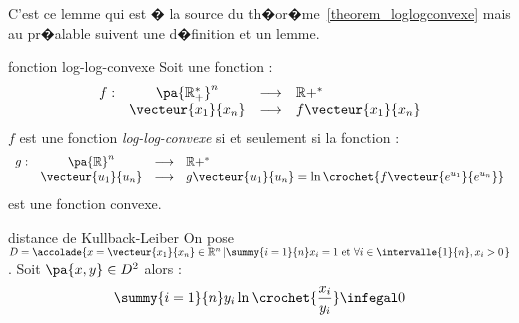 C'est ce lemme qui est � la source du th�or�me~\ref{theorem_loglogconvexe} mais au pr�alable suivent une d�finition et un lemme.








            \begin{xdefinition}{fonction log-log-convexe}
            \label{definition_log_log_convexe}
            Soit une fonction :
                    $$
                    \begin{array}{rccl}
                    f : & \pa{\mathbb{R}^*_+}^n &\longrightarrow& \mathbb{R}+^* \\
                    & \vecteur{x_1}{x_n} &\longrightarrow& f \vecteur{x_1}{x_n}
                    \end{array}
                    $$
            $f$ est une fonction \emph{log-log-convexe} si et seulement si la fonction :
                    $$
                    \begin{array}{rccl}
                    g : & \pa{\mathbb{R}}^n &\longrightarrow& \mathbb{R}+^* \\
                    & \vecteur{u_1}{u_n} &\longrightarrow& g\vecteur{u_1}{u_n} = \ln \crochet{ f \vecteur{e^{u_1}}{e^{u_n}}}
                    \end{array}
                    $$
            est une fonction convexe.
            \end{xdefinition}







            \begin{xlemma}{distance de Kullback-Leiber}
            \label{lemme_loglogconvexe}%
            On pose $D = \accolade{x=\vecteur{x_1}{x_n} \in \mathbb{R}^n \left| \summy{i=1}{n} x_i = 1 \text{ et } 
                            \forall i \in \intervalle{1}{n}, x_i > 0 \right.} $.\newline%
            Soit $\pa{x,y} \in D^2$ alors :
                    $$
                    \summy{i=1}{n} y_i \ln \crochet{\dfrac{x_i}{y_i}} \infegal 0
                    $$
            \end{xlemma}



